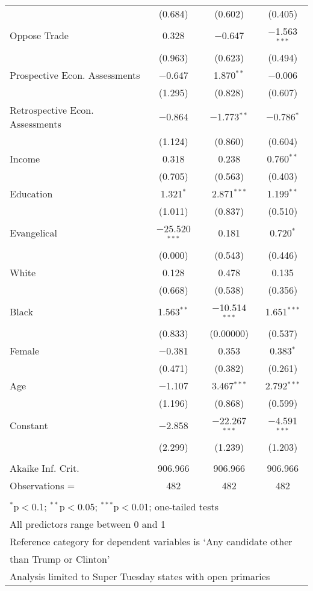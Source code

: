 \documentclass[12pt]{article}
\begin{document}
\begin{appendices}
\begin{refsection}
\begin{table}[!t]
\begin{adjustbox}{width=0.6\textwidth,center}
\begin{tabular}{@{\extracolsep{5pt}}lccc}
  & (0.684) & (0.602) & (0.405) \\ 
 Oppose Trade & 0.328 & $-$0.647 & $-$1.563$^{***}$ \\ 
  & (0.963) & (0.623) & (0.494) \\ 
 Prospective Econ. Assessments & $-$0.647 & 1.870$^{**}$ & $-$0.006 \\ 
  & (1.295) & (0.828) & (0.607) \\ 
 Retrospective Econ. Assessments & $-$0.864 & $-$1.773$^{**}$ & $-$0.786$^{*}$ \\ 
  & (1.124) & (0.860) & (0.604) \\ 
 Income & 0.318 & 0.238 & 0.760$^{**}$ \\ 
  & (0.705) & (0.563) & (0.403) \\ 
 Education & 1.321$^{*}$ & 2.871$^{***}$ & 1.199$^{**}$ \\ 
  & (1.011) & (0.837) & (0.510) \\ 
 Evangelical & $-$25.520$^{***}$ & 0.181 & 0.720$^{*}$ \\ 
  & (0.000) & (0.543) & (0.446) \\ 
 White & 0.128 & 0.478 & 0.135 \\ 
  & (0.668) & (0.538) & (0.356) \\ 
 Black & 1.563$^{**}$ & $-$10.514$^{***}$ & 1.651$^{***}$ \\ 
  & (0.833) & (0.00000) & (0.537) \\ 
 Female & $-$0.381 & 0.353 & 0.383$^{*}$ \\ 
  & (0.471) & (0.382) & (0.261) \\ 
 Age & $-$1.107 & 3.467$^{***}$ & 2.792$^{***}$ \\ 
  & (1.196) & (0.868) & (0.599) \\ 
 Constant & $-$2.858 & $-$22.267$^{***}$ & $-$4.591$^{***}$ \\ 
  & (2.299) & (1.239) & (1.203) \\ 
\hline \\[-1.8ex] 
Akaike Inf. Crit. & 906.966 & 906.966 & 906.966 \\ 
Observations =  & 482 & 482 & 482 \\
\hline 
\hline \\[-1.8ex] 
\multicolumn{4}{l}{\footnotesize $^{*}$p$<$0.1; $^{**}$p$<$0.05; $^{***}$p$<$0.01; one-tailed tests} \\ 
\multicolumn{4}{l}{\footnotesize All predictors range between 0 and 1} \\
\multicolumn{4}{l}{\footnotesize Reference category for dependent variables is `Any candidate other} \\
\multicolumn{4}{l}{\footnotesize \hspace{2pt} than Trump or Clinton'} \\
\multicolumn{4}{l}{\footnotesize Analysis limited to Super Tuesday states with open primaries}
\end{tabular} 
\end{adjustbox}
\end{table}





\end{refsection}
\end{appendices}
\end{document}

